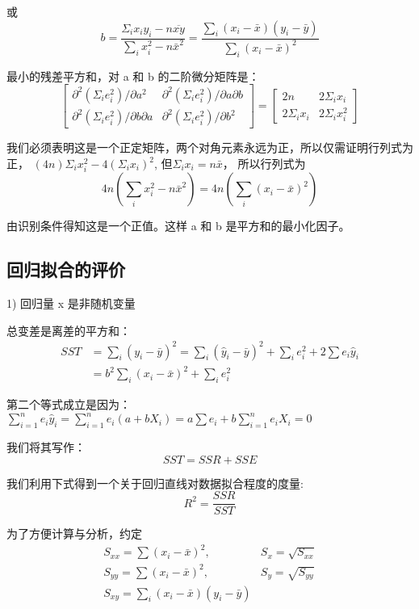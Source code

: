 或
$$b=\frac{\Sigma_{i} x_{i} y_{i}-n \overline{x y}}{\sum_{i} x_{i}^{2}-n \bar{x}^{2}}=\frac{\sum_{i}\left(x_{i}-\bar{x}\right)\left(y_{i}-\bar{y}\right)}{\sum_{i}\left(x_{i}-\bar{x}\right)^{2}}$$

最小的残差平方和，对 a 和 b 的二阶微分矩阵是：
$$\left[\begin{array}{cc}
    \partial^{2}\left(\Sigma_{i} e_{i}^{2}\right) / \partial a^{2} & \partial^{2}\left(\Sigma_{i} e_{i}^{2}\right) / \partial a \partial b \\
    \partial^{2}\left(\Sigma_{i} e_{i}^{2}\right) / \partial b \partial a & \partial^{2}\left(\Sigma_{i} e_{i}^{2}\right) / \partial b^{2}
    \end{array}\right]=\left[\begin{array}{cc}
    2 n & 2 \Sigma_{i} x_{i} \\
    2 \Sigma_{i} x_{i} & 2 \Sigma_{i} x_{i}^{2}
\end{array}\right]$$

我们必须表明这是一个正定矩阵，两个对角元素永远为正，所以仅需证明行列式为正， $(4 n) \Sigma_{i} x_{i}^{2}-4\left(\Sigma_{i} x_{i}\right)^{2}$, 但$\Sigma_{i} x_{i}=n \bar{x}$， 所以行列式为
$$ 4 n\left(\sum_{i} x_{i}^{2}-n \bar{x}^{2}\right)=4 n\left(\sum_{i}\left(x_{i}-\bar{x}\right)^{2}\right)$$ 

由识别条件得知这是一个正值。这样 a 和 b 是平方和的最小化因子。
 \subsection{回归拟合的评价}

1) 回归量 x 是非随机变量

总变差是离差的平方和：
    \begin{align*}
    S S T & = \sum_{i}\left(y_{i}-\bar{y}\right)^{2}  = \sum_{i}\left(\hat{y}_{i}-\bar{y}\right)^{2}+\sum_{i} e_{i}^{2}+2 \sum e_{i} \hat{y}_{i} \\ 
    & = b^{2} \sum_{i}\left(x_{i}-\bar{x}\right)^{2}+\sum_{i} e_{i}^{2}
    \end{align*} 

    第二个等式成立是因为：$\sum_{i=1}^{n} e_{i} \hat{y}_{i}=\sum_{i=1}^{n} e_{i}\left(a+b X_{i}\right)=a \sum e_{i}+b \sum_{i=1}^{n} e_{i} X_{i}=0$

    我们将其写作：
    $$ SST = SSR + SSE $$

    我们利用下式得到一个关于回归直线对数据拟合程度的度量:
    $$ R^{2}=\frac{S S R}{S S T} $$

    为了方便计算与分析，约定
    $$ \begin{array}{ll}
        S_{x x}=\sum\left(x_{i}-\bar{x}\right)^{2}, & S_{x}=\sqrt{S_{x x}} \\
        S_{y y}=\sum\left(x_{i}-\bar{x}\right)^{2}, & S_{y}=\sqrt{S_{y y}} \\
        S_{x y}=\sum_{i}\left(x_{i}-\bar{x}\right)\left(y_{i}-\bar{y}\right)
        \end{array} $$ 


